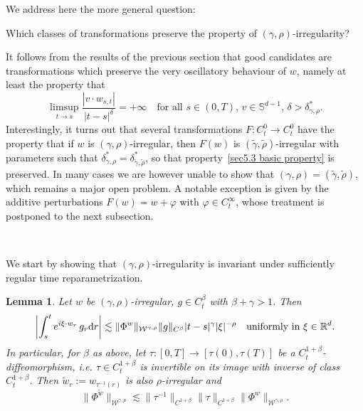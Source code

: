 \documentclass[10pt]{article}
\newcommand{\assign}{:=}
\newcommand{\comma}{{,}}
\newcommand{\mathd}{\mathrm{d}}
\newcommand{\tmcolor}[2]{{\color{#1}{#2}}}
\newtheorem{lemma}[theorem]{Lemma}
\begin{document}
We address here the more general question:

\begin{center}
  Which classes of transformations preserve the property of $(\gamma,
  \rho)$\mbox{-}irregularity?
\end{center}

It follows from the results of the previous section that good candidates are
transformations which preserve the very oscillatory behaviour of $w$, namely
at least the property that
\begin{equation}
  \limsup_{t \rightarrow s} \frac{| v \cdot w_{s, t} |}{| t - s |^{\delta}} =
  + \infty \quad \text{for all } s \in (0, T), \, v \in \mathbb{S}^{d - 1}, \,
  \delta > \delta^{\ast}_{\gamma, \rho} . \label{sec5.3 basic property}
\end{equation}
Interestingly, it turns out that several transformations $F : C^0_t
\rightarrow C^0_t$ have the property that if $w$ is $(\gamma,
\rho)$\mbox{-}irregular, then $F (w)$ is $(\tilde{\gamma},
\tilde{\rho})$\mbox{-}irregular with parameters such that
$\delta^{\ast}_{\gamma, \rho} = \delta^{\ast}_{\tilde{\gamma}, \tilde{\rho}}$,
so that property~{\eqref{sec5.3 basic property}} is preserved. In many cases
we are however unable to show that $(\gamma, \rho) = (\tilde{\gamma},
\tilde{\rho})$, which remains a major open problem. A notable exception is
given by the additive perturbations $F (w) = w + \varphi$ with $\varphi \in
C^{\infty}_t$, whose treatment is postponed to the next subsection.

\

We start by showing that $(\gamma, \rho)$\mbox{-}irregularity is invariant
under sufficiently regular time reparametrization.

\begin{lemma}
  \label{sec5.2 lemma time reparametrization}Let $w$ be $(\gamma,
  \rho)$-irregular, $g \in C^{\beta}_t$ with $\beta + \gamma > 1$. Then
  \[ \left| \int_s^t e^{i \xi \cdot w_r} \, g_r \mathd r \right| \lesssim
     \tmcolor{black}{\| \Phi^w \|_{\mathcal{W}^{\gamma \comma \rho}}} \| g
     \|_{C^{\beta}} | t - s |^{\gamma} | \xi |^{- \rho} \quad \text{uniformly
     in $\xi \in \mathbb{R}^d$.} \]
  In particular, for $\beta$ as above, let $\tau : [0, T] \rightarrow [\tau
  (0), \tau (T)]$ be a $C_t^{1 + \beta}$-diffeomorphism, i.e. $\tau \in C_t^{1
  + \beta}$ is invertible on its image with inverse of class $C_t^{1 +
  \beta}$. Then $\tilde{w}_r \assign w_{\tau^{- 1} (r)}$ is also
  $\rho$\mbox{-}irregular and
  \begin{equation}
    \| \Phi^{\tilde{w}} \|_{\mathcal{W}^{\gamma \comma \rho}} \lesssim \|
    \tau^{- 1} \|_{C^{1 + \beta}} \| \tau \|_{C^{1 + \beta}} \| \Phi^w
    \|_{\mathcal{W}^{\gamma \comma \rho}} . \label{sec5.3 estimate
    reparametrization}
  \end{equation}
\end{lemma}
\end{document}
